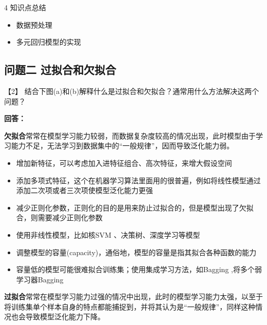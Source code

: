 \documentclass[11pt]{article}
\providecommand{\tightlist}{%
      \setlength{\itemsep}{0pt}\setlength{\parskip}{0pt}}
\begin{document}
    4 知识点总结

\begin{itemize}
\tightlist
\item
  数据预处理
\item
  多元回归模型的实现
\end{itemize}

    \hypertarget{ux95eeux9898ux4e8c-ux8fc7ux62dfux5408ux548cux6b20ux62dfux5408}{%
\subsection{问题二
过拟合和欠拟合}\label{ux95eeux9898ux4e8c-ux8fc7ux62dfux5408ux548cux6b20ux62dfux5408}}

    【2】
结合下图(a)和(b)解释什么是过拟合和欠拟合？通常用什么方法解决这两个问题？

\textbf{回答：}

    \textbf{欠拟合}常常在模型学习能力较弱，而数据复杂度较高的情况出现，此时模型由于学习能力不足，无法学习到数据集中的``一般规律''，因而导致泛化能力弱。

\begin{itemize}
\tightlist
\item
  增加新特征，可以考虑加入进特征组合、高次特征，来增大假设空间
\item
  添加多项式特征，这个在机器学习算法里面用的很普遍，例如将线性模型通过添加二次项或者三次项使模型泛化能力更强
\item
  减少正则化参数，正则化的目的是用来防止过拟合的，但是模型出现了欠拟合，则需要减少正则化参数
\item
  使用非线性模型，比如核SVM 、决策树、深度学习等模型
\item
  调整模型的容量(capacity)，通俗地，模型的容量是指其拟合各种函数的能力
\item
  容量低的模型可能很难拟合训练集；使用集成学习方法，如Bagging
  ,将多个弱学习器Bagging
\end{itemize}

    \textbf{过拟合}常常在模型学习能力过强的情况中出现，此时的模型学习能力太强，以至于将训练集单个样本自身的特点都能捕捉到，并将其认为是``一般规律''，同样这种情况也会导致模型泛化能力下降。
\end{document}
